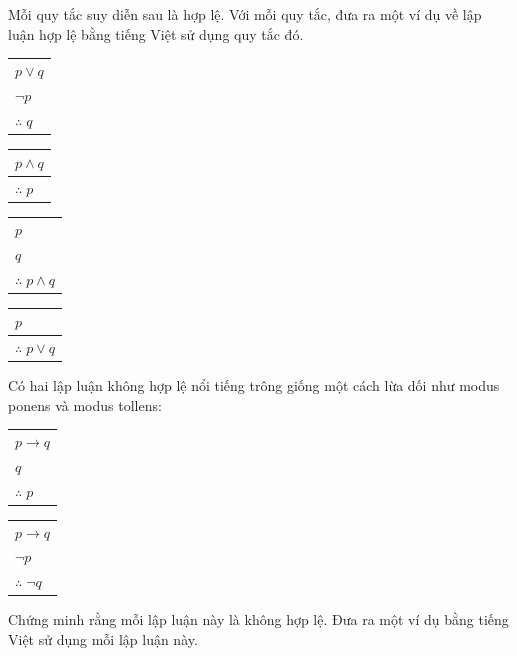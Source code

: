 \begin{exercise}
Mỗi quy tắc suy diễn sau là hợp lệ. Với mỗi quy tắc, đưa ra một ví dụ về lập luận hợp lệ bằng tiếng Việt sử dụng quy tắc đó.

\begin{center}
\begin{minipage}{0.2\textwidth}
\begin{tabular}{l}
$p \lor q$ \\
$\neg p$ \\
\hline
$\therefore\; q$
\end{tabular}
\end{minipage}
\hfill
\begin{minipage}{0.2\textwidth}
\begin{tabular}{l}
$p \land q$ \\
\hline
$\therefore\; p$
\end{tabular}
\end{minipage}
\hfill
\begin{minipage}{0.2\textwidth}
\begin{tabular}{l}
$p$ \\
$q$ \\
\hline
$\therefore\; p \land q$
\end{tabular}
\end{minipage}
\hfill
\begin{minipage}{0.2\textwidth}
\begin{tabular}{l}
$p$ \\
\hline
$\therefore\; p \lor q$
\end{tabular}
\end{minipage}
\end{center}
\end{exercise}

\begin{exercise}
Có hai lập luận không hợp lệ nổi tiếng trông giống một cách lừa dối như modus ponens và modus tollens:

\begin{center}
\begin{minipage}{0.35\textwidth}
\begin{tabular}{l}
$p \to q$ \\
$q$ \\
\hline
$\therefore\; p$
\end{tabular}
\end{minipage}
\hfill
\begin{minipage}{0.35\textwidth}
\begin{tabular}{l}
$p \to q$ \\
$\neg p$ \\
\hline
$\therefore\; \neg q$
\end{tabular}
\end{minipage}
\end{center}

Chứng minh rằng mỗi lập luận này là không hợp lệ. Đưa ra một ví dụ bằng tiếng Việt sử dụng mỗi lập luận này.
\end{exercise}

